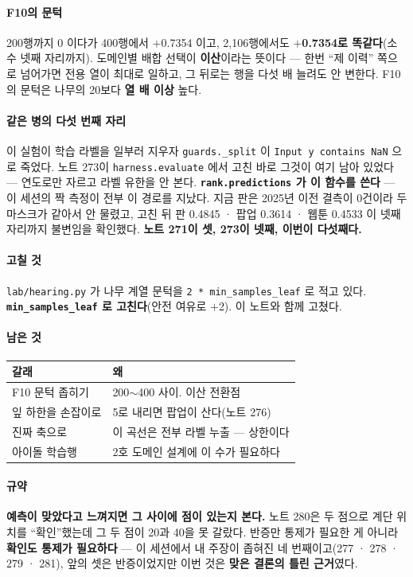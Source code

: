 \documentclass[10pt]{article}
\begin{document}
\paragraph{F10의 문턱} 200행까지 0 이다가 400행에서 $+$0.7354 이고, 2,106행에서도
\textbf{$+$0.7354로 똑같다}(소수 넷째 자리까지). 도메인별 배합 선택이
\textbf{이산}이라는 뜻이다 --- 한번 ``제 이력'' 쪽으로 넘어가면 전용 열이
최대로 일하고, 그 뒤로는 행을 다섯 배 늘려도 안 변한다. F10의 문턱은 나무의
20보다 \textbf{열 배 이상} 높다.

\paragraph{같은 병의 다섯 번째 자리} 이 실험이 학습 라벨을 일부러 지우자
\texttt{guards.\_split} 이 \texttt{Input y contains NaN} 으로 죽었다. 노트
273이 \texttt{harness.evaluate} 에서 고친 바로 그것이 여기 남아 있었다 ---
연도로만 자르고 라벨 유한을 안 본다. \textbf{\texttt{rank.predictions} 가
이 함수를 쓴다} --- 이 세션의 짝 측정이 전부 이 경로를 지났다. 지금 판은
2025년 이전 결측이 0건이라 두 마스크가 같아서 안 물렸고, 고친 뒤 판 0.4845 ·
팝업 0.3614 · 웹툰 0.4533 이 넷째 자리까지 불변임을 확인했다. \textbf{노트
271이 셋, 273이 넷째, 이번이 다섯째다.}

\paragraph{고칠 것} \texttt{lab/hearing.py} 가 나무 계열 문턱을
\texttt{2 * min\_samples\_leaf} 로 적고 있다. \textbf{\texttt{min\_samples\_leaf}
로 고친다}(안전 여유로 $+$2). 이 노트와 함께 고쳤다.

\paragraph{남은 것}
\begin{center}\small
\begin{tabular}{ll}
\hline
갈래 & 왜 \\
\hline
F10 문턱 좁히기 & 200$\sim$400 사이. 이산 전환점 \\
잎 하한을 손잡이로 & 5로 내리면 팝업이 산다(노트 276) \\
진짜 축으로 & 이 곡선은 전부 라벨 누출 --- 상한이다 \\
아이돌 학습행 & 2호 도메인 설계에 이 수가 필요하다 \\
\hline
\end{tabular}
\end{center}

\paragraph{규약} \textbf{예측이 맞았다고 느껴지면 그 사이에 점이 있는지
본다.} 노트 280은 두 점으로 계단 위치를 ``확인''했는데 그 두 점이 20과 40을
못 갈랐다. 반증만 통제가 필요한 게 아니라 \textbf{확인도 통제가 필요하다} ---
이 세션에서 내 주장이 좁혀진 네 번째이고(277 · 278 · 279 · 281), 앞의 셋은
반증이었지만 이번 것은 \textbf{맞은 결론의 틀린 근거}였다.
\end{document}
